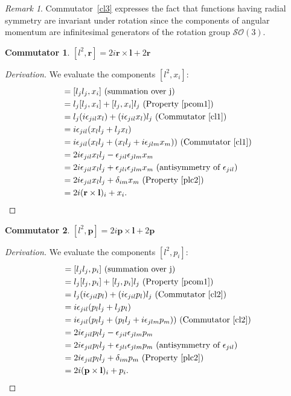 \documentclass[12pt,a4paper]{report}
\theoremstyle{definition}
\newtheorem{commutator}{Commutator}[section]
\newenvironment{derivation}
  {\renewcommand\qedsymbol{$\square$}\begin{proof}[Derivation]}
  {\end{proof}}
\theoremstyle{remark}
\newtheorem*{remark}{Remark}
\theoremstyle{remark}
\begin{document}
\begin{appendices}
\begin{remark}
Commutator~\ref{cl3} expresses the fact that functions having radial symmetry are invariant
under rotation since the components of angular momentum are infinitesimal generators of the rotation group $\mathcal{SO}(3)$.
\end{remark}

\begin{commutator}\label{cl4}
$[l^2,\textbf{r}]=2i\textbf{r}\times\textbf{l}+2\textbf{r}$
\end{commutator} 
\begin{derivation}
We evaluate the components $[l^2,x_i]$:
\begin{align*}
[l^2,x_i] &= [l_jl_j,x_i] \text{ (summation over j)} \\
&= l_j[l_j,x_i]+[l_j,x_i]l_j \text{ (Property~\ref{pcom1})} \\
&= l_j(i\epsilon_{jil}x_l)+(i\epsilon_{jil}x_l)l_j \text{ (Commutator~\ref{cl1})} \\
&= i\epsilon_{jil}(x_ll_j+l_jx_l) \\
&= i\epsilon_{jil}(x_ll_j+(x_ll_j+i\epsilon_{jlm}x_m)) \text{ (Commutator~\ref{cl1})} \\
&= 2i\epsilon_{jil}x_ll_j-\epsilon_{jil}\epsilon_{jlm}x_m \\
&= 2i\epsilon_{jil}x_ll_j+\epsilon_{jli}\epsilon_{jlm}x_m \text{ (antisymmetry of }\epsilon_{jil}) \\
&= 2i\epsilon_{jil}x_ll_j+\delta_{im}x_m \text{ (Property~\ref{plc2})} \\
&= 2i(\textbf{r}\times\textbf{l})_i+x_i.
\end{align*}
\end{derivation}

\begin{commutator}\label{cl5}
$[l^2,\textbf{p}]=2i\textbf{p}\times\textbf{l}+2\textbf{p}$
\end{commutator} 
\begin{derivation}
We evaluate the components $[l^2,p_i]$:
\begin{align*}
[l^2,p_i] &= [l_jl_j,p_i] \text{ (summation over j)} \\
&= l_j[l_j,p_i]+[l_j,p_i]l_j \text{ (Property~\ref{pcom1})} \\
&= l_j(i\epsilon_{jil}p_l)+(i\epsilon_{jil}p_l)l_j \text{ (Commutator~\ref{cl2})} \\
&= i\epsilon_{jil}(p_ll_j+l_jp_l) \\
&= i\epsilon_{jil}(p_ll_j+(p_ll_j+i\epsilon_{jlm}p_m)) \text{ (Commutator~\ref{cl2})} \\
&= 2i\epsilon_{jil}p_ll_j-\epsilon_{jil}\epsilon_{jlm}p_m \\
&= 2i\epsilon_{jil}p_ll_j+\epsilon_{jli}\epsilon_{jlm}p_m \text{ (antisymmetry of }\epsilon_{jil}) \\
&= 2i\epsilon_{jil}p_ll_j+\delta_{im}p_m \text{ (Property~\ref{plc2})} \\
&= 2i(\textbf{p}\times\textbf{l})_i+p_i.
\end{align*}
\end{derivation}


\end{appendices}
\end{document}

